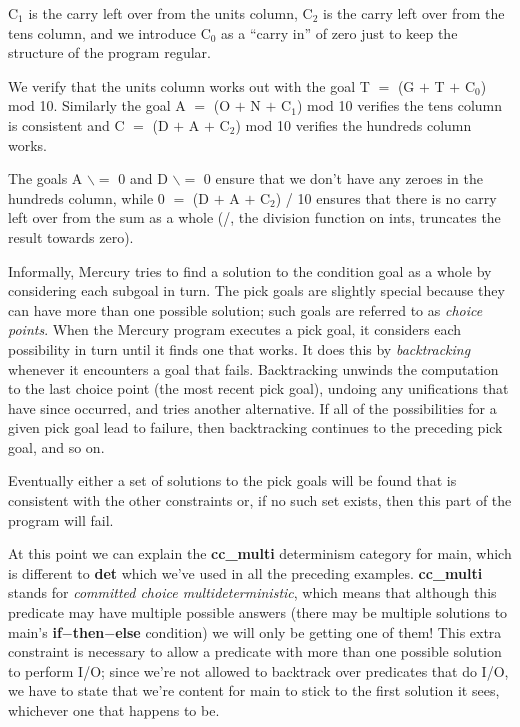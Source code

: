 \documentclass[a4paper,11pt,notitlepage,onecolumn]{book}
\begin{document}
\textsf{C$_{1}$} is the carry left over from the units column, \textsf{C$_{2}$} is the carry left
over from the tens column, and we introduce \textsf{C$_{0}$} as a ``carry in'' of
zero just to keep the structure of the program regular.

We verify that the units column works out with the goal
\textsf{T {\ensuremath{=}} (G {\ensuremath{+}} T {\ensuremath{+}} C$_{0}$) mod 10}.  Similarly the goal
\textsf{A {\ensuremath{=}} (O {\ensuremath{+}} N {\ensuremath{+}} C$_{1}$) mod 10} verifies the tens column is consistent and
\textsf{C {\ensuremath{=}} (D {\ensuremath{+}} A {\ensuremath{+}} C$_{2}$) mod 10} verifies the hundreds column works.

The goals \textsf{A {\ensuremath{\backslash}}{\ensuremath{=}} 0} and \textsf{D {\ensuremath{\backslash}}{\ensuremath{=}} 0} ensure that we don't have any zeroes in the
hundreds column, while \textsf{0 {\ensuremath{=}} (D {\ensuremath{+}} A {\ensuremath{+}} C$_{2}$) / 10} ensures that there is no
carry left over from the sum as a whole (\textsf{/}, the division function on
\textsf{int}s, truncates the result towards zero).

Informally, Mercury tries to find a solution to the condition goal as a
whole by considering each subgoal in turn.  The \textsf{pick} goals are slightly
special because they can have more than one possible solution; such goals are
referred to as \emph{choice points}.  When the
Mercury program executes a \textsf{pick} goal, it considers each possibility in
turn until it finds one that works.  It does this by \emph{backtracking}
whenever it encounters a goal that fails.  Backtracking unwinds the
computation to the last choice point (\ie the most recent \textsf{pick} goal),
undoing any unifications that have since occurred, and tries another
alternative.  If all of the possibilities for a given \textsf{pick} goal lead to
failure, then backtracking continues to the preceding \textsf{pick} goal, and so
on.

Eventually either a set of solutions to the \textsf{pick} goals will be found that
is consistent with the other constraints or, if no such set exists, then
this part of the program will fail.

At this point we can explain the \textsf{\textbf{cc\_multi}} determinism category for \textsf{main},
which is different to \textsf{\textbf{det}} which we've used in all the preceding examples.
\textsf{\textbf{cc\_multi}} stands for \emph{committed choice multideterministic}, which means
that although this predicate may have multiple possible answers (there may
be multiple solutions to \textsf{main}'s \textsf{\textbf{if}{\ensuremath{-}}\textbf{then}{\ensuremath{-}}\textbf{else}} condition) we will only be
getting one of them!  This extra constraint is necessary to allow a
predicate with more than one possible solution to perform I/O; since we're
not allowed to backtrack over predicates that do I/O, we have to state that
we're content for \textsf{main} to stick to the first solution it sees, whichever
one that happens to be.
\end{document}
